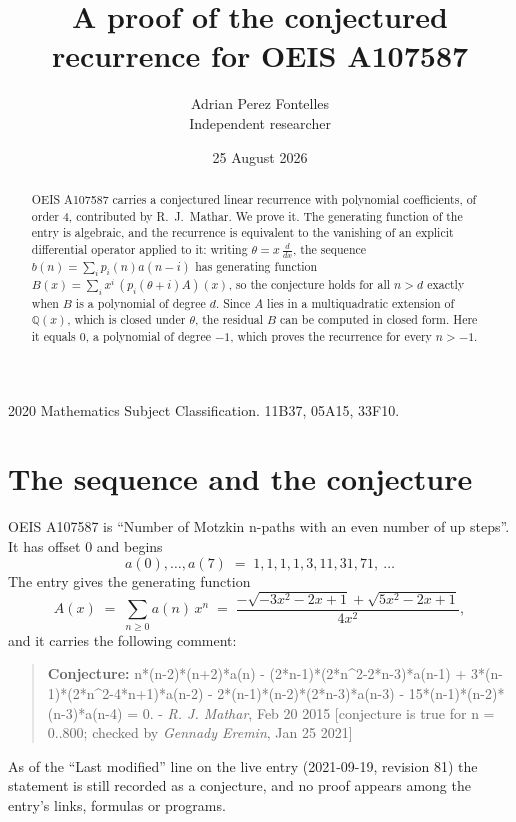 \documentclass[11pt,a4paper]{article}
\title{A proof of the conjectured recurrence for OEIS A107587}
\author{Adrian Perez Fontelles\\ \small Independent researcher}
\date{25 August 2026}
\theoremstyle{plain}
\theoremstyle{definition}
\begin{document}
\maketitle

\begin{abstract}
OEIS A107587 carries a conjectured linear recurrence with polynomial coefficients, of
order 4, contributed by R.~J.~Mathar. We prove it. The generating function of the
entry is algebraic, and the recurrence is equivalent to the vanishing of an explicit
differential operator applied to it: writing $\theta=x\,\frac{d}{dx}$, the sequence
$b(n)=\sum_{i}p_{i}(n)a(n-i)$ has generating function
$B(x)=\sum_{i}x^{i}\,(p_{i}(\theta+i)A)(x)$, so the conjecture holds for all $n>d$ exactly
when $B$ is a polynomial of degree $d$. Since $A$ lies in a multiquadratic extension of
$\mathbb{Q}(x)$, which is closed under $\theta$, the residual $B$ can be computed in
closed form. Here it equals $0$, a polynomial of degree $-1$, which proves
the recurrence for every $n>-1$.
\end{abstract}

\noindent\small 2020 Mathematics Subject Classification. 11B37, 05A15, 33F10.\normalsize

\section{The sequence and the conjecture}

OEIS A107587 is ``Number of Motzkin n-paths with an even number of up steps''. It has offset $0$ and begins
\[
a(0),\dots,a(7)\;=\;1, 1, 1, 1, 3, 11, 31, 71,\ \dots
\]
The entry gives the generating function
\begin{equation}\label{eq:gf}
A(x)\;=\;\sum_{n\ge 0} a(n)\,x^{n}\;=\;\frac{- \sqrt{- 3 x^{2} - 2 x + 1} + \sqrt{5 x^{2} - 2 x + 1}}{4 x^{2}} ,
\end{equation}
and it carries the following comment:
\begin{quote}\small
\textbf{Conjecture:} n*(n-2)*(n+2)*a(n) - (2*n-1)*(2*n\^{}2-2*n-3)*a(n-1) + 3*(n-1)*(2*n\^{}2-4*n+1)*a(n-2) - 2*(n-1)*(n-2)*(2*n-3)*a(n-3) - 15*(n-1)*(n-2)*(n-3)*a(n-4) = 0. - \emph{R. J. Mathar}, Feb 20 2015 [conjecture is true for n = 0..800; checked by \emph{Gennady Eremin}, Jan 25 2021]
\end{quote}
As of the ``Last modified'' line on the live entry (2021-09-19, revision 81) the
statement is still recorded as a conjecture, and no proof appears among the entry's links,
formulas or programs.
\end{document}
